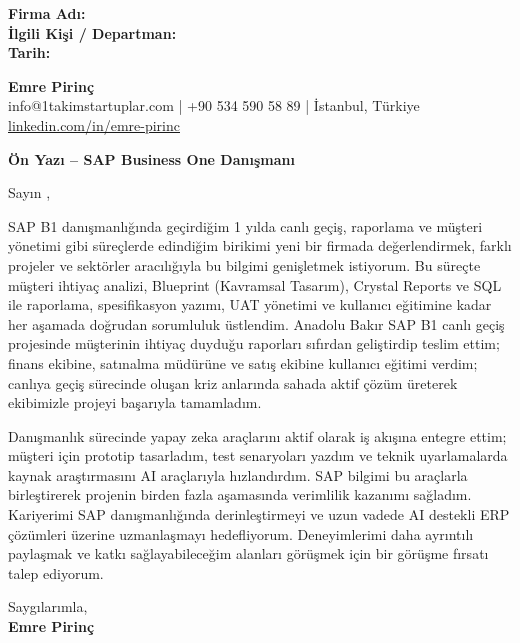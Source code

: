 \documentclass[a4paper,10pt]{extarticle}
\newcommand{\blank}[1]{\uline{\hspace{#1}}}
\begin{document}
\textbf{Firma Adı:} \blank{6cm}\\
\textbf{İlgili Kişi / Departman:} \blank{5cm}\\
\textbf{Tarih:} \blank{4cm}

\vspace{16pt}

{\large\bfseries Emre Pirinç}\\
{\small info@1takimstartuplar.com | +90 534 590 58 89 | İstanbul, Türkiye}\\
{\small \href{https://linkedin.com/in/emre-pirinc}{linkedin.com/in/emre-pirinc}}

\vspace{12pt}

{\Large\bfseries Ön Yazı -- SAP Business One Danışmanı}

\vspace{8pt}

Sayın \blank{6cm},

SAP B1 danışmanlığında geçirdiğim 1 yılda canlı geçiş, raporlama ve müşteri yönetimi gibi süreçlerde edindiğim birikimi yeni bir firmada değerlendirmek, farklı projeler ve sektörler aracılığıyla bu bilgimi genişletmek istiyorum. Bu süreçte müşteri ihtiyaç analizi, Blueprint (Kavramsal Tasarım), Crystal Reports ve SQL ile raporlama, spesifikasyon yazımı, UAT yönetimi ve kullanıcı eğitimine kadar her aşamada doğrudan sorumluluk üstlendim. Anadolu Bakır SAP B1 canlı geçiş projesinde müşterinin ihtiyaç duyduğu raporları sıfırdan geliştirdip teslim ettim; finans ekibine, satınalma müdürüne ve satış ekibine kullanıcı eğitimi verdim; canlıya geçiş sürecinde oluşan kriz anlarında sahada aktif çözüm üreterek ekibimizle projeyi başarıyla tamamladım.

Danışmanlık sürecinde yapay zeka araçlarını aktif olarak iş akışına entegre ettim; müşteri için prototip tasarladım, test senaryoları yazdım ve teknik uyarlamalarda kaynak araştırmasını AI araçlarıyla hızlandırdım. SAP bilgimi bu araçlarla birleştirerek projenin birden fazla aşamasında verimlilik kazanımı sağladım. Kariyerimi SAP danışmanlığında derinleştirmeyi ve uzun vadede AI destekli ERP çözümleri üzerine uzmanlaşmayı hedefliyorum. Deneyimlerimi daha ayrıntılı paylaşmak ve katkı sağlayabileceğim alanları görüşmek için bir görüşme fırsatı talep ediyorum.

\vspace{16pt}

Saygılarımla,\\[4pt]
{\bfseries Emre Pirinç}
\end{document}
